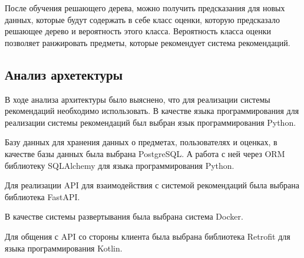 После обучения решающего дерева, можно получить предсказания для новых данных, которые будут содержать в себе класс
оценки, которую предсказало решающее дерево и вероятность этого класса.
Вероятность класса оценки позволяет ранжировать предметы, которые рекомендует система рекомендаций.

\subsection{Анализ архетектуры}
В ходе анализа архитектуры было выяснено, что для реализации системы рекомендаций необходимо использовать.
В качестве языка программирования для реализации системы рекомендаций был выбран язык программирования Python.

Базу данных для хранения данных о предметах, пользователях и оценках, в качестве базы данных была выбрана PostgreSQL.
А работа с ней через ORM библиотеку SQLAlchemy для языка программирования Python.

Для реализации API для взаимодействия с системой рекомендаций была выбрана библиотека FastAPI.

В качестве системы развертывания была выбрана система Docker.

Для общения с API со стороны клиента была выбрана библиотека Retrofit для языка программирования Kotlin.